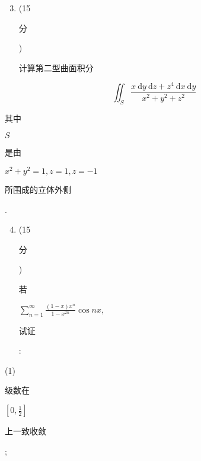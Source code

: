 \documentclass[10pt]{article}
\begin{document}
\begin{enumerate}
  \setcounter{enumi}{2}
  \item (15 \begin{CJK}{UTF8}{mj}分\end{CJK}) \begin{CJK}{UTF8}{mj}计算第二型曲面积分\end{CJK}
\end{enumerate}
$$
\iint_{S} \frac{x \mathrm{~d} y \mathrm{~d} z+z^{4} \mathrm{~d} x \mathrm{~d} y}{x^{2}+y^{2}+z^{2}}
$$
\begin{CJK}{UTF8}{mj}其中\end{CJK} $S$ \begin{CJK}{UTF8}{mj}是由\end{CJK} $x^{2}+y^{2}=1, z=1, z=-1$ \begin{CJK}{UTF8}{mj}所围成的立体外侧\end{CJK}.

\begin{enumerate}
  \setcounter{enumi}{3}
  \item (15 \begin{CJK}{UTF8}{mj}分\end{CJK}) \begin{CJK}{UTF8}{mj}若\end{CJK} $\sum_{n=1}^{\infty} \frac{(1-x) x^{n}}{1-x^{2 n}} \cos n x$, \begin{CJK}{UTF8}{mj}试证\end{CJK}:
\end{enumerate}
(1) \begin{CJK}{UTF8}{mj}级数在\end{CJK} $\left[0, \frac{1}{2}\right]$ \begin{CJK}{UTF8}{mj}上一致收敛\end{CJK};
\end{document}
